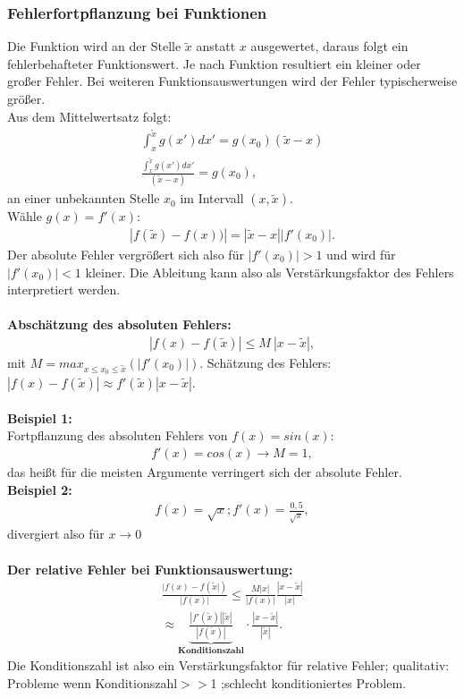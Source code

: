 \documentclass{scrartcl}
\begin{document}
\subsubsection{Fehlerfortpflanzung bei Funktionen}
Die Funktion wird an der Stelle $\tilde{x}$ anstatt $x$ ausgewertet, daraus folgt ein fehlerbehafteter Funktionswert.
Je nach Funktion resultiert ein kleiner oder großer Fehler.
Bei weiteren Funktionsauswertungen wird der Fehler typischerweise größer.\\
Aus dem Mittelwertsatz folgt:
\begin{align*}
\int_x^{\tilde{x}}g(x')dx'=g(x_0)(\tilde{x}-x)\\
\frac{\int_x^{\tilde{x}}g(x')dx'}{(\tilde{x}-x)}=g(x_0),
\end{align*}
an einer unbekannten Stelle $x_0$ im Intervall $(x,\tilde{x})$.\\
Wähle $g(x)=f'(x)$:
\begin{align*}
|f(\tilde{x})-f(x))|=|\tilde{x}-x||f'(x_0)|.
\end{align*}
Der absolute Fehler vergrößert sich also für $|f'(x_0)|>1$ und wird für $|f'(x_0)|<1$ kleiner.
Die Ableitung kann also als Verstärkungsfaktor des Fehlers interpretiert werden.\\
\\

\textbf{Abschätzung des absoluten Fehlers:}\\
\begin{align*}
|f(x)-f(\tilde{x})|\leq M \ |x-\tilde{x}|,
\end{align*}
mit $M=max_{x\leq x_0 \leq \tilde{x}} (|f'(x_0)|)$.
Schätzung des Fehlers: $|f(x)-f(\tilde{x})| \approx f'(\tilde{x})|x-\tilde{x}|$.\\
\\
\textbf{Beispiel 1:}\\
Fortpflanzung des absoluten Fehlers von $f(x)=sin(x)$:
\begin{align*}
f'(x)=cos(x) \rightarrow M=1,
\end{align*}
das heißt für die meisten Argumente verringert sich der absolute Fehler.\\
\textbf{Beispiel 2:}
\begin{align*}
f(x)=\sqrt{x};f'(x)=\frac{0,5}{\sqrt{x}},
\end{align*}
divergiert also für $x \rightarrow 0$\\
\\

\textbf{Der relative Fehler bei Funktionsauswertung:}
\begin{align*}
\frac{|f(x)-f(\tilde{x}|)}{|f(x)|}\leq \frac{M |x|}{|f(x)|} \frac{|x-\tilde{x}|}{|x|}\\
\approx \underbrace{\frac{|f'(\tilde{x})||\tilde{x}|}{|f(\tilde{x})|}}_{\textbf{Konditionszahl}} \cdot  \frac{|x-\tilde{x}|}{|\tilde{x}|}.
\end{align*}
Die Konditionszahl ist also ein Verstärkungsfaktor für relative Fehler;
qualitativ: Probleme wenn Konditionszahl$>>$1 ;schlecht konditioniertes Problem.
\end{document}
